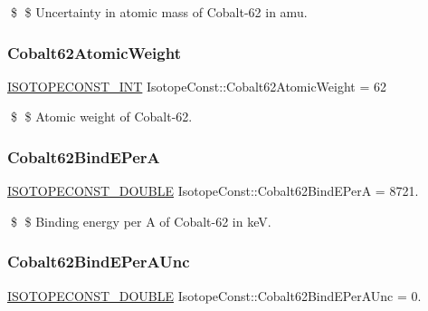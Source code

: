 \$ \$ Uncertainty in atomic mass of Cobalt-\/62 in amu. \mbox{\label{group___isotope_const-_cobalt-_co62_ga4d0bbe8a97f6c7586a994605c3deda43}} 
\subsubsection{\texorpdfstring{Cobalt62\+Atomic\+Weight}{Cobalt62AtomicWeight}}
{\footnotesize\ttfamily \mbox{\hyperlink{group___isotope_const-_macros_ga5f18360b3e99483a35c32d789e62621c}{I\+S\+O\+T\+O\+P\+E\+C\+O\+N\+S\+T\+\_\+\+I\+NT}} Isotope\+Const\+::\+Cobalt62\+Atomic\+Weight = 62}

\$ \$ Atomic weight of Cobalt-\/62. \mbox{\label{group___isotope_const-_cobalt-_co62_gab09f1316e9a09e5f1227d7196913a4b2}} 
\subsubsection{\texorpdfstring{Cobalt62\+Bind\+E\+PerA}{Cobalt62BindEPerA}}
{\footnotesize\ttfamily \mbox{\hyperlink{group___isotope_const-_macros_ga8f45a7272ce02c0b4c65c44636ed719a}{I\+S\+O\+T\+O\+P\+E\+C\+O\+N\+S\+T\+\_\+\+D\+O\+U\+B\+LE}} Isotope\+Const\+::\+Cobalt62\+Bind\+E\+PerA = 8721.}

\$ \$ Binding energy per A of Cobalt-\/62 in keV. \mbox{\label{group___isotope_const-_cobalt-_co62_gadaf95b1439174f87e3a65c280e852936}} 
\subsubsection{\texorpdfstring{Cobalt62\+Bind\+E\+Per\+A\+Unc}{Cobalt62BindEPerAUnc}}
{\footnotesize\ttfamily \mbox{\hyperlink{group___isotope_const-_macros_ga8f45a7272ce02c0b4c65c44636ed719a}{I\+S\+O\+T\+O\+P\+E\+C\+O\+N\+S\+T\+\_\+\+D\+O\+U\+B\+LE}} Isotope\+Const\+::\+Cobalt62\+Bind\+E\+Per\+A\+Unc = 0.}

